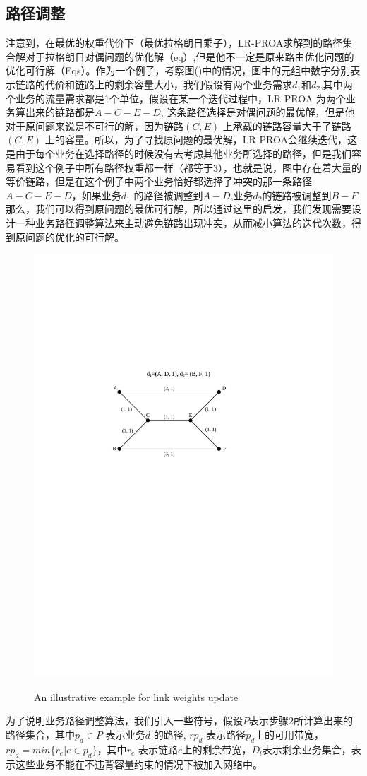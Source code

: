 \subsection{路径调整}
  注意到，在最优的权重代价下（最优拉格朗日乘子），LR-PROA求解到的路径集合解对于拉格朗日对偶问题的优化解（eq）,但是他不一定是原来路由优化问题的优化可行解（Eqs）。作为一个例子，考察图()中的情况，图中的元组中数字分别表示链路的代价和链路上的剩余容量大小，我们假设有两个业务需求$d_1$和$d_2$,其中两个业务的流量需求都是1个单位，假设在某一个迭代过程中，LR-PROA 为两个业务算出来的链路都是$A-C-E-D$, 这条路径选择是对偶问题的最优解，但是他对于原问题来说是不可行的解，因为链路$(C,E)$ 上承载的链路容量大于了链路$(C,E)$ 上的容量。所以，为了寻找原问题的最优解，LR-PROA会继续迭代，这是由于每个业务在选择路径的时候没有去考虑其他业务所选择的路径，但是我们容易看到这个例子中所有路径权重都一样（都等于3），也就是说，图中存在着大量的等价链路，但是在这个例子中两个业务恰好都选择了冲突的那一条路径$A-C-E-D$，如果业务$d_1$ 的路径被调整到$A-D$,业务$d_2$的链路被调整到$B-F$, 那么，我们可以得到原问题的最优可行解，所以通过这里的启发，我们发现需要设计一种业务路径调整算法来主动避免链路出现冲突，从而减小算法的迭代次数，得到原问题的优化的可行解。
\begin{figure}
\setlength{\belowcaptionskip}{-0.1cm}
  \begin{center}
    {\includegraphics[width=0.4 \textwidth]{figures/PathAdj.pdf}}
    \end{center}
  \caption{{\footnotesize{An illustrative example for link weights update}}}
  \label{IterNum}
\end{figure}
  为了说明业务路径调整算法，我们引入一些符号，假设$P$表示步骤2所计算出来的路径集合，其中$p_d\in P$ 表示业务$d$ 的路径, $rp_{d}$ 表示路径$p_d$上的可用带宽，$rp_{d} = min\{r_e | e\in p_d\}$，其中$r_e$ 表示链路$e$上的剩余带宽，$D_l$表示剩余业务集合，表示这些业务不能在不违背容量约束的情况下被加入网络中。
